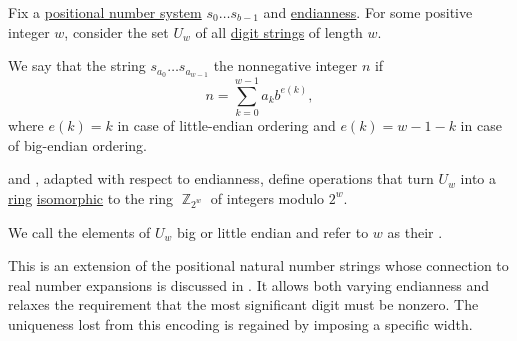 \begin{definition}\label{def:ring_of_unsigned_integers}\mimprovised
  Fix a \hyperref[def:positional_number_system]{positional number system} \( s_0 \ldots s_{b-1} \) and \hyperref[def:endianness]{endianness}. For some positive integer \( w \), consider the set \( U_w \) of all \hyperref[def:positional_number_system]{digit strings} of length \( w \).

  We say that the string \( s_{a_0} \ldots s_{a_{w-1}} \)  the nonnegative integer \( n \) if
  \begin{equation*}
    n = \sum_{k=0}^{w-1} a_k b^{e(k)},
  \end{equation*}
  where \( e(k) = k \) in case of little-endian ordering and \( e(k) = w - 1 - k \) in case of big-endian ordering.

   and , adapted with respect to endianness, define operations that turn \( U_w \) into a \hyperref[def:ring]{ring} \hyperref[def:algebra_over_semiring/homomorphism]{isomorphic} to the ring \hyperref[def:ring_of_integers_modulo]{\( \BbbZ_{2^w} \)} of integers modulo \( 2^w \).

  We call the elements of \( U_w \) big or little endian  and refer to \( w \) as their .
\end{definition}
\begin{comments}
  \item This is an extension of the positional natural number strings whose connection to real number expansions is discussed in . It allows both varying endianness and relaxes the requirement that the most significant digit must be nonzero. The uniqueness lost from this encoding is regained by imposing a specific width.
\end{comments}
